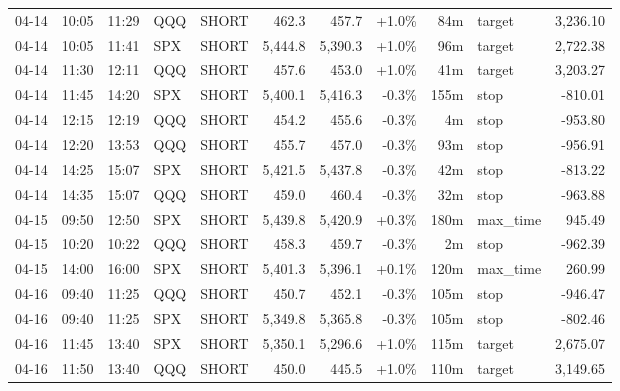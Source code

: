 \documentclass[11pt,a4paper,twoside]{article}
\begin{document}
\begin{center}
\begin{longtable}{>{\color{txtmain}}l l l l l r r r r >{\color{txtmain}}l r}
04-14 & 10:05 & 11:29 & QQQ & SHORT & 462.3 & 457.7 & \textcolor{wingreen}{+1.0\%} & 84m & target & \textcolor{wingreen}{3,236.10} \\
04-14 & 10:05 & 11:41 & SPX & SHORT & 5,444.8 & 5,390.3 & \textcolor{wingreen}{+1.0\%} & 96m & target & \textcolor{wingreen}{2,722.38} \\
04-14 & 11:30 & 12:11 & QQQ & SHORT & 457.6 & 453.0 & \textcolor{wingreen}{+1.0\%} & 41m & target & \textcolor{wingreen}{3,203.27} \\
04-14 & 11:45 & 14:20 & SPX & SHORT & 5,400.1 & 5,416.3 & \textcolor{lossred}{-0.3\%} & 155m & stop & \textcolor{lossred}{-810.01} \\
04-14 & 12:15 & 12:19 & QQQ & SHORT & 454.2 & 455.6 & \textcolor{lossred}{-0.3\%} & 4m & stop & \textcolor{lossred}{-953.80} \\
04-14 & 12:20 & 13:53 & QQQ & SHORT & 455.7 & 457.0 & \textcolor{lossred}{-0.3\%} & 93m & stop & \textcolor{lossred}{-956.91} \\
04-14 & 14:25 & 15:07 & SPX & SHORT & 5,421.5 & 5,437.8 & \textcolor{lossred}{-0.3\%} & 42m & stop & \textcolor{lossred}{-813.22} \\
04-14 & 14:35 & 15:07 & QQQ & SHORT & 459.0 & 460.4 & \textcolor{lossred}{-0.3\%} & 32m & stop & \textcolor{lossred}{-963.88} \\
04-15 & 09:50 & 12:50 & SPX & SHORT & 5,439.8 & 5,420.9 & \textcolor{wingreen}{+0.3\%} & 180m & max\_time & \textcolor{wingreen}{945.49} \\
04-15 & 10:20 & 10:22 & QQQ & SHORT & 458.3 & 459.7 & \textcolor{lossred}{-0.3\%} & 2m & stop & \textcolor{lossred}{-962.39} \\
04-15 & 14:00 & 16:00 & SPX & SHORT & 5,401.3 & 5,396.1 & \textcolor{wingreen}{+0.1\%} & 120m & max\_time & \textcolor{wingreen}{260.99} \\
04-16 & 09:40 & 11:25 & QQQ & SHORT & 450.7 & 452.1 & \textcolor{lossred}{-0.3\%} & 105m & stop & \textcolor{lossred}{-946.47} \\
04-16 & 09:40 & 11:25 & SPX & SHORT & 5,349.8 & 5,365.8 & \textcolor{lossred}{-0.3\%} & 105m & stop & \textcolor{lossred}{-802.46} \\
04-16 & 11:45 & 13:40 & SPX & SHORT & 5,350.1 & 5,296.6 & \textcolor{wingreen}{+1.0\%} & 115m & target & \textcolor{wingreen}{2,675.07} \\
04-16 & 11:50 & 13:40 & QQQ & SHORT & 450.0 & 445.5 & \textcolor{wingreen}{+1.0\%} & 110m & target & \textcolor{wingreen}{3,149.65} \\

\end{longtable}
\end{center}
\end{document}

